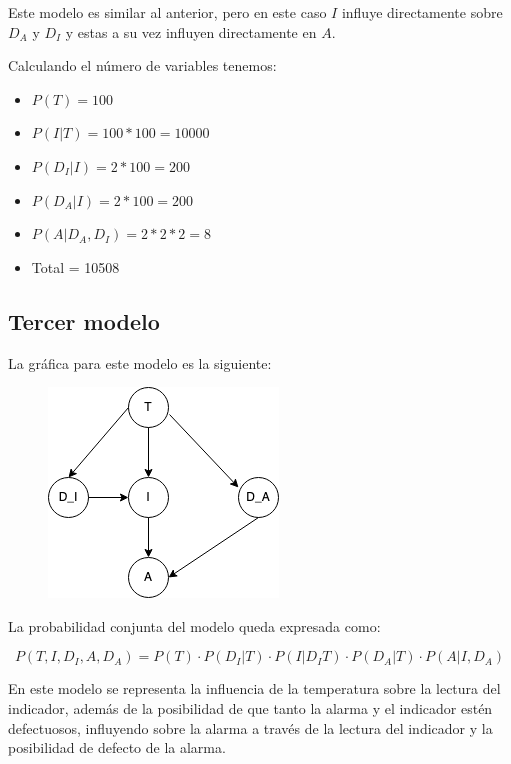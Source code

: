 \documentclass[letterpaper,12pt]{article}
\theoremstyle{definition}
\begin{document}
Este modelo es similar al anterior, pero en este caso \(I\) influye directamente sobre \(D_A\) y \(D_I\) y estas a su vez influyen directamente en \(A\).

Calculando el número de variables tenemos:

\begin{itemize}
	\item \(P(T) = 100\)
	\item \(P(I|T) = 100 * 100 = 10000\)
	\item \(P(D_I|I) = 2 * 100 = 200\)
	\item \(P(D_A|I) = 2 * 100 = 200\)
	\item \(P(A|D_A,D_I) = 2 * 2 * 2 = 8\)
	\item Total = 10508
\end{itemize}



\subsection*{Tercer modelo}

La gráfica para este modelo es la siguiente: \\

\begin{figure}[H]
	\centering
	\includegraphics{m3}
\end{figure}


La probabilidad conjunta del modelo queda expresada como:

\begin{equation}
P(T,I,D_I,A,D_A) = P(T)\cdot P(D_I|T) \cdot P(I|D_IT) \cdot P(D_A|T)\cdot P(A|I,D_A)
\end{equation}

En este modelo se representa la influencia de la temperatura sobre la lectura del indicador, además de la posibilidad de que tanto la alarma y el indicador estén defectuosos, influyendo sobre la alarma a través de la lectura del indicador y la posibilidad de defecto de la alarma.
\end{document}
